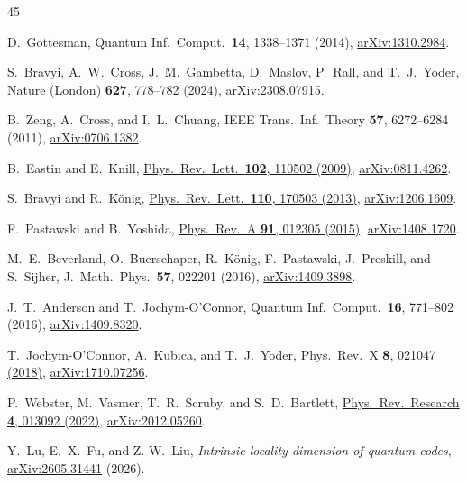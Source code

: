 \documentclass[aps,prl,reprint,notitlepage,nofootinbib,nobibnotes]{revtex4-2}
\begin{document}
\begin{thebibliography}{45}

D.~Gottesman,
Quantum Inf.\ Comput.\ \textbf{14}, 1338--1371 (2014),
\href{https://arxiv.org/abs/1310.2984}{arXiv:1310.2984}.

S.~Bravyi, A.~W.~Cross, J.~M.~Gambetta, D.~Maslov, P.~Rall, and T.~J.~Yoder,
Nature (London) \textbf{627}, 778--782 (2024),
\href{https://arxiv.org/abs/2308.07915}{arXiv:2308.07915}.

B.~Zeng, A.~Cross, and I.~L.~Chuang,
IEEE Trans.\ Inf.\ Theory \textbf{57}, 6272--6284 (2011),
\href{https://arxiv.org/abs/0706.1382}{arXiv:0706.1382}.

B.~Eastin and E.~Knill,
\href{https://link.aps.org/doi/10.1103/PhysRevLett.102.110502}{Phys.\ Rev.\ Lett.\ \textbf{102},
110502 (2009)},
\href{https://arxiv.org/abs/0811.4262}{arXiv:0811.4262}.

S.~Bravyi and R.~K\"onig,
\href{https://link.aps.org/doi/10.1103/PhysRevLett.110.170503}{Phys.\ Rev.\ Lett.\ \textbf{110},
170503 (2013)},
\href{https://arxiv.org/abs/1206.1609}{arXiv:1206.1609}.

F.~Pastawski and B.~Yoshida,
\href{https://link.aps.org/doi/10.1103/PhysRevA.91.012305}{Phys.\ Rev.\ A \textbf{91}, 012305
(2015)},
\href{https://arxiv.org/abs/1408.1720}{arXiv:1408.1720}.

M.~E.~Beverland, O.~Buerschaper, R.~K\"onig, F.~Pastawski, J.~Preskill, and S.~Sijher,
J.\ Math.\ Phys.\ \textbf{57}, 022201 (2016),
\href{https://arxiv.org/abs/1409.3898}{arXiv:1409.3898}.

J.~T.~Anderson and T.~Jochym-O'Connor,
Quantum Inf.\ Comput.\ \textbf{16}, 771--802 (2016),
\href{https://arxiv.org/abs/1409.8320}{arXiv:1409.8320}.

T.~Jochym-O'Connor, A.~Kubica, and T.~J.~Yoder,
\href{https://link.aps.org/doi/10.1103/PhysRevX.8.021047}{Phys.\ Rev.\ X \textbf{8}, 021047
(2018)},
\href{https://arxiv.org/abs/1710.07256}{arXiv:1710.07256}.

P.~Webster, M.~Vasmer, T.~R.~Scruby, and S.~D.~Bartlett,
\href{https://link.aps.org/doi/10.1103/PhysRevResearch.4.013092}{Phys.\ Rev.\ Research \textbf{4},
013092 (2022)},
\href{https://arxiv.org/abs/2012.05260}{arXiv:2012.05260}.

Y.~Lu, E.~X.~Fu, and Z.-W.~Liu,
\emph{Intrinsic locality dimension of quantum codes},
\href{https://arxiv.org/abs/2605.31441}{arXiv:2605.31441} (2026).


\end{thebibliography}
\end{document}
